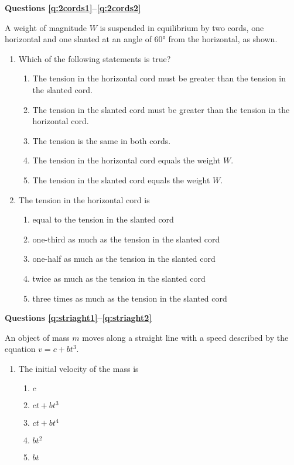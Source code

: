 \documentclass{../../oss-apphys}
\begin{document}
\begin{multicols}{2}
  \textbf{Questions \ref{q:2cords1}--\ref{q:2cords2}}

  A weight of magnitude $W$ is suspended in equilibrium by two cords, one
  horizontal and one slanted at an angle of \ang{60} from the horizontal, as
  shown.
  \begin{center}
  \end{center}
  \begin{enumerate}[resume,leftmargin=18pt]
  \item Which of the following statements is true?
    \begin{enumerate}[noitemsep,topsep=0pt,leftmargin=18pt,label=(\Alph*)]
    \item The tension in the horizontal cord must be greater than the tension
      in the slanted cord.
    \item The tension in the slanted cord must be greater than the tension in
      the horizontal cord.
    \item The tension is the same in both cords.
    \item The tension in the horizontal cord equals the weight $W$.
    \item The tension in the slanted cord equals the weight $W$.
    \end{enumerate}
    \label{q:2cords1}
    
  \item The tension in the horizontal cord is
    \begin{enumerate}[noitemsep,topsep=0pt,leftmargin=18pt,label=(\Alph*)]
    \item equal to the tension in the slanted cord
    \item one-third as much as the tension in the slanted cord
    \item one-half as much as the tension in the slanted cord
    \item twice as much as the tension in the slanted cord
    \item three times as much as the tension in the slanted cord
    \end{enumerate}
    \label{q:2cords2}
  \end{enumerate}
  \columnbreak
  
  \textbf{Questions \ref{q:striaght1}--\ref{q:striaght2}}

  An object of mass $m$ moves along a straight line with a speed described by
  the equation $v=c+bt^3$.
  \begin{enumerate}[resume,leftmargin=18pt]
  \item The initial velocity of the mass is
    \begin{enumerate}[noitemsep,topsep=0pt,leftmargin=18pt,label=(\Alph*)]
    \item $c$
    \item $ct+bt^3$
    \item $ct+bt^4$
    \item $bt^2$
    \item $bt$
    \end{enumerate}
    \label{q:striaght1}


\end{enumerate}
\end{multicols}
\end{document}
